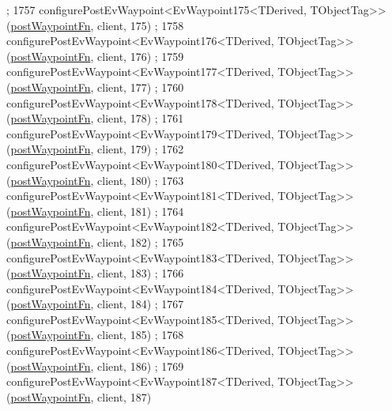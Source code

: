 \begin{DoxyCode}
      ;
1757     configurePostEvWaypoint<EvWaypoint175<TDerived, TObjectTag>>(\hyperlink{classmove__base__z__client_1_1WaypointEventDispatcher_acc538eb7506c13f7cca2268a1742dadd}{postWaypointFn}, client, 175)
      ;
1758     configurePostEvWaypoint<EvWaypoint176<TDerived, TObjectTag>>(\hyperlink{classmove__base__z__client_1_1WaypointEventDispatcher_acc538eb7506c13f7cca2268a1742dadd}{postWaypointFn}, client, 176)
      ;
1759     configurePostEvWaypoint<EvWaypoint177<TDerived, TObjectTag>>(\hyperlink{classmove__base__z__client_1_1WaypointEventDispatcher_acc538eb7506c13f7cca2268a1742dadd}{postWaypointFn}, client, 177)
      ;
1760     configurePostEvWaypoint<EvWaypoint178<TDerived, TObjectTag>>(\hyperlink{classmove__base__z__client_1_1WaypointEventDispatcher_acc538eb7506c13f7cca2268a1742dadd}{postWaypointFn}, client, 178)
      ;
1761     configurePostEvWaypoint<EvWaypoint179<TDerived, TObjectTag>>(\hyperlink{classmove__base__z__client_1_1WaypointEventDispatcher_acc538eb7506c13f7cca2268a1742dadd}{postWaypointFn}, client, 179)
      ;
1762     configurePostEvWaypoint<EvWaypoint180<TDerived, TObjectTag>>(\hyperlink{classmove__base__z__client_1_1WaypointEventDispatcher_acc538eb7506c13f7cca2268a1742dadd}{postWaypointFn}, client, 180)
      ;
1763     configurePostEvWaypoint<EvWaypoint181<TDerived, TObjectTag>>(\hyperlink{classmove__base__z__client_1_1WaypointEventDispatcher_acc538eb7506c13f7cca2268a1742dadd}{postWaypointFn}, client, 181)
      ;
1764     configurePostEvWaypoint<EvWaypoint182<TDerived, TObjectTag>>(\hyperlink{classmove__base__z__client_1_1WaypointEventDispatcher_acc538eb7506c13f7cca2268a1742dadd}{postWaypointFn}, client, 182)
      ;
1765     configurePostEvWaypoint<EvWaypoint183<TDerived, TObjectTag>>(\hyperlink{classmove__base__z__client_1_1WaypointEventDispatcher_acc538eb7506c13f7cca2268a1742dadd}{postWaypointFn}, client, 183)
      ;
1766     configurePostEvWaypoint<EvWaypoint184<TDerived, TObjectTag>>(\hyperlink{classmove__base__z__client_1_1WaypointEventDispatcher_acc538eb7506c13f7cca2268a1742dadd}{postWaypointFn}, client, 184)
      ;
1767     configurePostEvWaypoint<EvWaypoint185<TDerived, TObjectTag>>(\hyperlink{classmove__base__z__client_1_1WaypointEventDispatcher_acc538eb7506c13f7cca2268a1742dadd}{postWaypointFn}, client, 185)
      ;
1768     configurePostEvWaypoint<EvWaypoint186<TDerived, TObjectTag>>(\hyperlink{classmove__base__z__client_1_1WaypointEventDispatcher_acc538eb7506c13f7cca2268a1742dadd}{postWaypointFn}, client, 186)
      ;
1769     configurePostEvWaypoint<EvWaypoint187<TDerived, TObjectTag>>(\hyperlink{classmove__base__z__client_1_1WaypointEventDispatcher_acc538eb7506c13f7cca2268a1742dadd}{postWaypointFn}, client, 187)

\end{DoxyCode}
